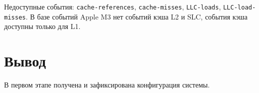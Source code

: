 Недоступные события: \texttt{cache-references}, \texttt{cache-misses}, \texttt{LLC-loads}, \texttt{LLC-load-misses}.
В базе событий Apple M3 нет событий кэша L2 и SLC, события кэша доступны только для L1.

\section{Вывод}

В первом этапе получена и зафиксирована конфигурация системы.
